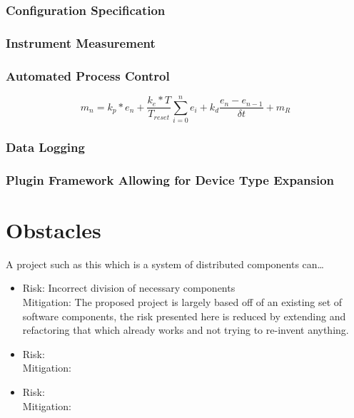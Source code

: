 \documentclass[11pt]{article}
\begin{document}
      \subsubsection{Configuration Specification}\label{sec:desc-domain-conf}

      \subsubsection{Instrument Measurement}\label{sec:desc-domain-instr}

      \subsubsection{Automated Process Control}\label{sec:desc-domain-ctrl}


        \begin{equation}
          m_n = k_p*e_n + \frac{k_e*T}{T_{reset}}\sum_{i=0}^{n}e_i + k_d\frac{e_n - e_{n-1}}{\delta t} + m_{R}
        \end{equation}

      \subsubsection{Data Logging}\label{sec:desc-domain-logging}

      \subsubsection{Plugin Framework Allowing for Device Type Expansion}\label{sec:desc-domain-plugin}

  \section{Obstacles}\label{sec:obstacles}

    A project such as this which is a system of distributed components can\dots

    \begin{itemize}
      \item Risk: Incorrect division of necessary components \\
            Mitigation: The proposed project is largely based off of an existing set of software components, the risk
            presented here is reduced by extending and refactoring that which already works and not trying to re-invent
            anything.
      \item Risk: \\
            Mitigation:
      \item Risk: \\
            Mitigation:
    \end{itemize}
\end{document}
